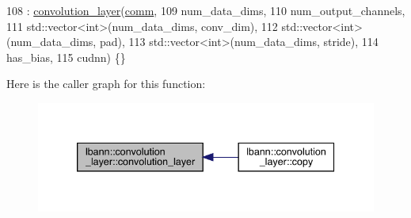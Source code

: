 \begin{DoxyCode}
108     : \hyperlink{classlbann_1_1convolution__layer_aad28b1304d9440fc50b3b54438587aa3}{convolution\_layer}(\hyperlink{file__io_8cpp_ab048c6f9fcbcfaa57ce68b00263dbebe}{comm},
109                         num\_data\_dims,
110                         num\_output\_channels,
111                         std::vector<int>(num\_data\_dims, conv\_dim),
112                         std::vector<int>(num\_data\_dims, pad),
113                         std::vector<int>(num\_data\_dims, stride),
114                         has\_bias,
115                         cudnn) \{\}
\end{DoxyCode}
Here is the caller graph for this function\+:\nopagebreak
\begin{figure}[H]
\begin{center}
\leavevmode
\includegraphics[width=339pt]{classlbann_1_1convolution__layer_aad28b1304d9440fc50b3b54438587aa3_icgraph}
\end{center}
\end{figure}
\mbox{\label{classlbann_1_1convolution__layer_acec65090b712cb902dbf58a6c037cf0c}} 
